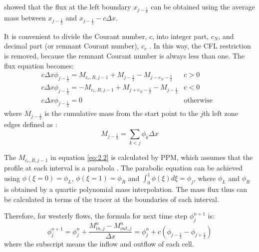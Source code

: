 \cite{Leonard1995} showed that the flux at the left boundary $x_{j-\frac{1}{2}}$ can be obtained using the average mass between $x_{j-\frac{1}{2}}$ and $x_{j-\frac{1}{2}}-c\Delta x$.

It is convenient to divide the Courant number, $c$, into integer part, $c_N$, and decimal part (or remnant Courant number), $c_r$ \citep{Leonard1995}. In this way, the CFL restriction is removed, because the remnant Courant number is always less than one. The flux equation becomes:
\begin{eqnarray} \label{eq:2.2}
c \Delta x \phi_{j-\frac{1}{2}} = M_{c_r,R,j-1} + M_{j-\frac{1}{2}}-M_{j-c_N-\frac{1}{2}} & \text{c}>0 &\nonumber \\
c \Delta x \phi_{j-\frac{1}{2}} = -M_{c_r,R,j-1} +M_{j+c_N-\frac{1}{2}}- M_{j-\frac{1}{2}} & \text{c}<0 & \\
c \Delta x \phi_{j-\frac{1}{2}} = 0 & \text{otherwise} \nonumber 
\end{eqnarray}
where $M_{j-\frac{1}{2}}$ is the cumulative mass from the start point to the $j$th left zone edges defined as \citep{Colella1984}:
\begin{equation} \label{eq:2.3}
M_{j-\frac{1}{2}} = \sum_{k < j} \phi_{k}\Delta x
\end{equation}

The $M_{c_r,R,j-1}$ in equation \ref{eq:2.2} is calculated by PPM, which assumes that the profile at each interval is a parabola \citep{Colella1984}. The parabolic equation can be achieved using $\phi(\xi = 0) = \phi_L$, $\phi(\xi = 1) = \phi_R$ and $ \int^{1}_{0} \phi (\xi) d\xi = \phi_j  $, where $\phi_L$ and $\phi_R$ is obtained by a quartic polynomial mass interpolation. The mass flux thus can be calculated in terms of the tracer at the boundaries of each interval.

Therefore, for westerly flows, the formula for next time step $\phi^{n+1}_j$ is: 
\begin{equation} \label{eq:2.12}
\phi^{n+1}_j = \phi^n_j + \frac{M^n_{in,j} - M^n_{out,j}}{\Delta x} = \phi^n_j + c(\phi_{j-\frac{1}{2}} - \phi_{j+\frac{1}{2}})%
\end{equation}
where the subscript means the inflow and outflow of each cell.

